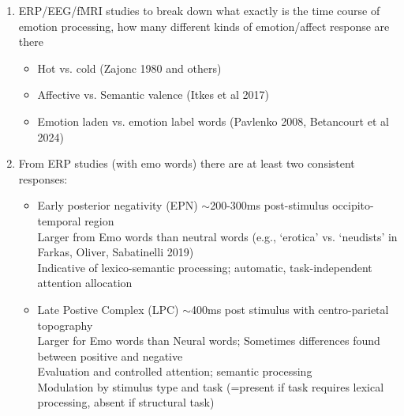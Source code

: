 \documentclass[12pt,letterpaper,table,svgnames,dvipsnames]{article}
\begin{document}
\begin{enumerate}
    

    \item ERP/EEG/fMRI studies to break down what exactly is the time course of emotion processing, how many different kinds of emotion/affect response are there

        \begin{itemize}
            \item Hot vs. cold (Zajonc 1980 and others)
            \item Affective vs. Semantic valence (Itkes et al 2017)
            \item Emotion laden vs. emotion label words (Pavlenko 2008, Betancourt et al 2024)
        \end{itemize}

    \item From ERP studies (with emo words) there are at least two consistent responses:
        \begin{itemize}
            \item Early posterior negativity (EPN) $\sim$200-300ms post-stimulus occipito-temporal region \\

            Larger from Emo words than neutral words (e.g., `erotica' vs. `neudists' in Farkas, Oliver, Sabatinelli 2019)\\

            Indicative of lexico-semantic processing; automatic, task-independent attention allocation\\


            \item Late Postive Complex (LPC) $\sim$400ms post stimulus with centro-parietal topography\\

            Larger for Emo words than Neural words; Sometimes differences found between positive and negative\\

            Evaluation and controlled attention; semantic processing\\

            Modulation by stimulus type and task (=present if task requires lexical processing, absent if structural task)

        \end{itemize}    
    

\end{enumerate}
\end{document}

